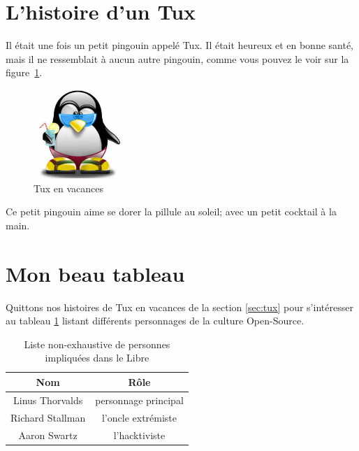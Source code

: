 \documentclass[a4paper, 12pt]{article}
\begin{document}
\section{L'histoire d'un Tux \label{sec:tux}}
Il était une fois un petit pingouin appelé Tux.  Il était heureux et en bonne santé, mais il ne ressemblait à aucun autre pingouin, comme vous pouvez le voir sur la figure~\ref{fig:tux}.
\begin{figure}
\centering
\includegraphics[width=0.3\textwidth]{tux.jpeg}
\caption{Tux en vacances}
\label{fig:tux}
\end{figure}
Ce petit pingouin aime se dorer la pillule au soleil; avec un petit cocktail à la main.

\section{Mon beau tableau}
Quittons nos histoires de Tux en vacances de la section \ref{sec:tux} pour s'intéresser au tableau \ref{tab:Linux} listant différents personnages de la culture Open-Source.
\begin{table}
\centering
\begin{tabular}{|c||c|}
\hline
Nom & Rôle \\
\hline
\hline
Linus Thorvalds & personnage principal \\
\hline
Richard Stallman & l'oncle extrémiste \\
\hline
Aaron Swartz & l'hacktiviste \\
\hline
\end{tabular}
\caption{Liste non-exhaustive de personnes impliquées dans le Libre}
\label{tab:Linux}
\end{table}
\end{document}
